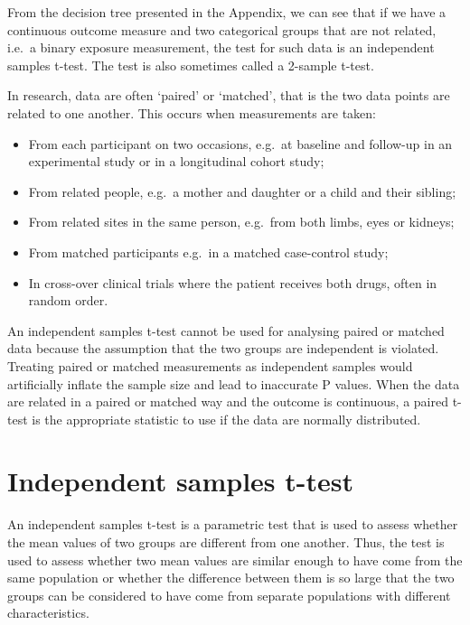 \documentclass[
  a4paper,
]{memoir}
\providecommand{\tightlist}{%
  \setlength{\itemsep}{0pt}\setlength{\parskip}{0pt}}
\begin{document}
From the decision tree presented in the Appendix, we can see that if we
have a continuous outcome measure and two categorical groups that are
not related, i.e.~a binary exposure measurement, the test for such data
is an independent samples t-test. The test is also sometimes called a
2-sample t-test.

In research, data are often `paired' or `matched', that is the two data
points are related to one another. This occurs when measurements are
taken:

\begin{itemize}
\tightlist
\item
  From each participant on two occasions, e.g.~at baseline and follow-up
  in an experimental study or in a longitudinal cohort study;
\item
  From related people, e.g.~a mother and daughter or a child and their
  sibling;
\item
  From related sites in the same person, e.g.~from both limbs, eyes or
  kidneys;
\item
  From matched participants e.g.~in a matched case-control study;
\item
  In cross-over clinical trials where the patient receives both drugs,
  often in random order.
\end{itemize}

An independent samples t-test cannot be used for analysing paired or
matched data because the assumption that the two groups are independent
is violated. Treating paired or matched measurements as independent
samples would artificially inflate the sample size and lead to
inaccurate P values. When the data are related in a paired or matched
way and the outcome is continuous, a paired t-test is the appropriate
statistic to use if the data are normally distributed.

\section{Independent samples t-test}\label{independent-samples-t-test}

An independent samples t-test is a parametric test that is used to
assess whether the mean values of two groups are different from one
another. Thus, the test is used to assess whether two mean values are
similar enough to have come from the same population or whether the
difference between them is so large that the two groups can be
considered to have come from separate populations with different
characteristics.
\end{document}
